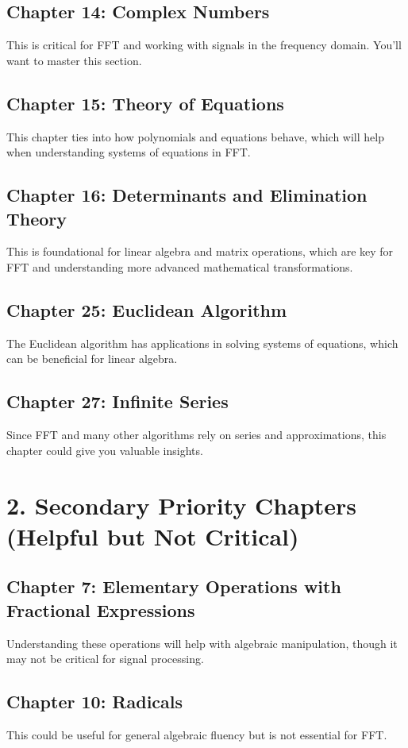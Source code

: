 \documentclass{article}
\begin{document}
\subsection*{Chapter 14: Complex Numbers}
This is critical for FFT and working with signals in the frequency domain. You’ll want to master this section.

\subsection*{Chapter 15: Theory of Equations}
This chapter ties into how polynomials and equations behave, which will help when understanding systems of equations in FFT.

\subsection*{Chapter 16: Determinants and Elimination Theory}
This is foundational for linear algebra and matrix operations, which are key for FFT and understanding more advanced mathematical transformations.

\subsection*{Chapter 25: Euclidean Algorithm}
The Euclidean algorithm has applications in solving systems of equations, which can be beneficial for linear algebra.

\subsection*{Chapter 27: Infinite Series}
Since FFT and many other algorithms rely on series and approximations, this chapter could give you valuable insights.

\section*{2. Secondary Priority Chapters (Helpful but Not Critical)}

\subsection*{Chapter 7: Elementary Operations with Fractional Expressions}
Understanding these operations will help with algebraic manipulation, though it may not be critical for signal processing.

\subsection*{Chapter 10: Radicals}
This could be useful for general algebraic fluency but is not essential for FFT.
\end{document}
